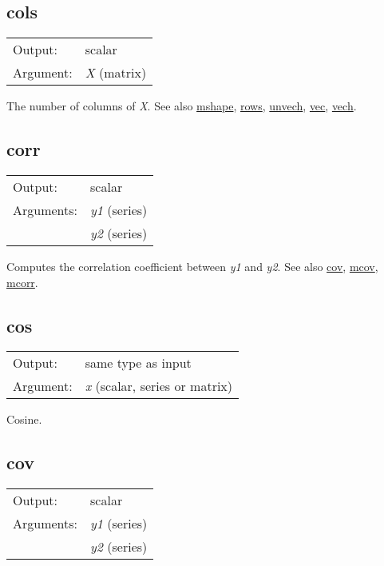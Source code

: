 \subsection{cols}
\hypertarget{func-cols}{}

\begin{tabular}{ll}
Output:     & scalar\\
Argument:   & \textsl{X} (matrix)\\
\end{tabular}

	  The number of columns of \textsl{X}. 
	  See also \hyperlink{func-mshape}{mshape}, \hyperlink{func-rows}{rows}, \hyperlink{func-unvech}{unvech}, \hyperlink{func-vec}{vec}, \hyperlink{func-vech}{vech}.

\subsection{corr}
\hypertarget{func-corr}{}

\begin{tabular}{ll}
Output:     & scalar\\
Arguments:  & \textsl{y1} (series)\\
           & \textsl{y2} (series)\\
\end{tabular}

	  Computes the correlation coefficient between \textsl{y1}
	  and \textsl{y2}. 
	  See also \hyperlink{func-cov}{cov}, \hyperlink{func-mcov}{mcov}, \hyperlink{func-mcorr}{mcorr}.

\subsection{cos}
\hypertarget{func-cos}{}

\begin{tabular}{ll}
Output:     & same type as input\\
Argument:   & \textsl{x} (scalar, series or matrix)\\
\end{tabular}

	  Cosine.

\subsection{cov}
\hypertarget{func-cov}{}

\begin{tabular}{ll}
Output:     & scalar\\
Arguments:  & \textsl{y1} (series)\\
           & \textsl{y2} (series)\\
\end{tabular}


